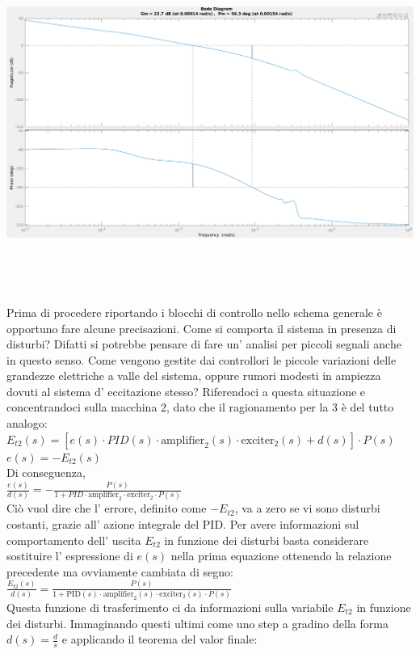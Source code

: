 \documentclass[Lau,noexaminfo]{sapthesis}
\begin{document}
	\includegraphics[scale=0.258]{margin_F3}\\\\\\\\\\
	Prima di procedere riportando i blocchi di controllo nello schema generale è opportuno fare alcune precisazioni. Come si comporta il sistema in presenza di disturbi? Difatti si potrebbe pensare di fare un' analisi per piccoli segnali anche in questo senso. Come vengono gestite dai controllori le piccole variazioni delle grandezze elettriche a valle del sistema, oppure rumori modesti in ampiezza dovuti al sistema d' eccitazione stesso? 
	Riferendoci a questa situazione e concentrandoci sulla macchina 2, dato che il ragionamento per la 3 è del tutto analogo:\\
	$E_{t2}(s)=[e(s)\cdot PID(s)\cdot \text{amplifier}_2(s)\cdot \text{exciter}_2(s)+d(s)]\cdot P(s)$\\
	$e(s)=-E_{t2}(s)$\\
	Di conseguenza,\\
	$\frac{e(s)}{d(s)}=-\frac{P(s)}{1+PID\cdot \text{amplifier}_2\cdot \text{exciter}_2\cdot P(s)}$\\
	Ciò vuol dire che l' errore, definito come $-E_{t2}$, va a zero se vi sono disturbi costanti, grazie all' azione integrale del PID. Per avere informazioni sul comportamento dell' uscita $E_{t2}$ in funzione dei disturbi basta considerare sostituire l' espressione di $e(s)$ nella prima equazione ottenendo la relazione precedente ma ovviamente cambiata di segno:\\
	$\frac{E_{t2}(s)}{d(s)}=\frac{P(s)}{1+\text{PID}(s)\cdot \text{amplifier}_2(s)\cdot \text{exciter}_2(s) \cdot P(s)}$\\
	Questa funzione di trasferimento ci da informazioni sulla variabile $E_{t2}$ in funzione dei disturbi. Immaginando questi ultimi come uno step a gradino della forma $d(s)=\frac{d}{s}$ e applicando il teorema del valor finale:\\
\end{document}
